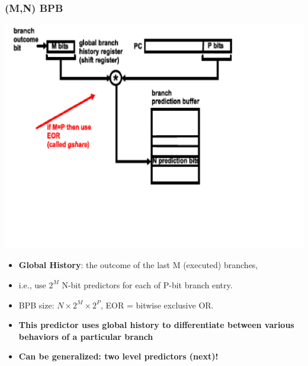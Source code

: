 \documentclass{beamer}
\newcommand{\emp}[1]{\textcolor{DikuRed}{ #1}}
\begin{document}
\begin{frame}[fragile,t]
\frametitle{(M,N) BPB}

\includegraphics[width=55ex]{FigsOoOProc/PredictorMN.pdf}
\vspace{-13ex}
\pause

\begin{itemize}
    \item \emp{\bf Global History}: the outcome of the last M (executed) branches,
    \item i.e., use $2^M$ N-bit predictors for each of P-bit branch entry.
    \item BPB size: $N\times2^M\times2^P$\medskip, EOR = bitwise exclusive OR. 
 
    \item \emp{\bf This predictor uses global history to differentiate
                between various behaviors of a particular branch}
    \item \emp{\bf Can be generalized: two level predictors (next)!}
\end{itemize}
\end{frame}
\end{document}

